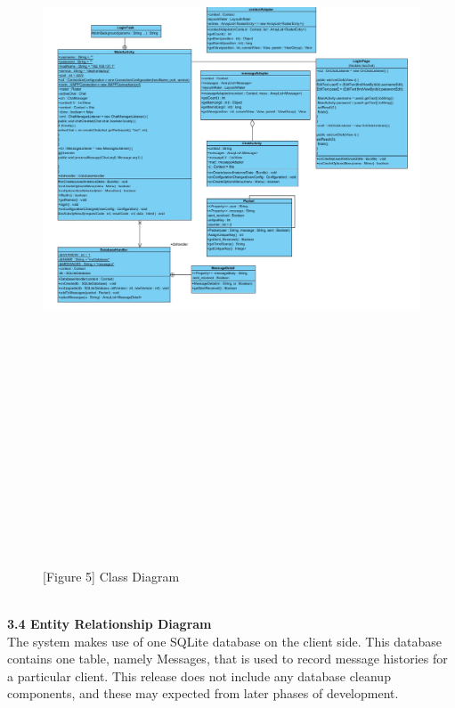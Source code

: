 \documentclass[29pt,a4paper]{moderncv}
\begin{document}
			\begin{figure}
				\centering
				\\ \includegraphics[width=7.0in, height=8.5in]{./Class_Diagram.jpg}
				\\\caption{[Figure 5] Class Diagram}\\
			\end{figure}
	
	\\ \noindent \textbf{3.4 Entity Relationship Diagram}
	\\The system makes use of one SQLite database on the client side.  This database contains one table, namely Messages, that is used to record message histories for a particular client.  This release does not include any database cleanup components, and these may expected from later phases of development.\\ \\
	
\end{document}
